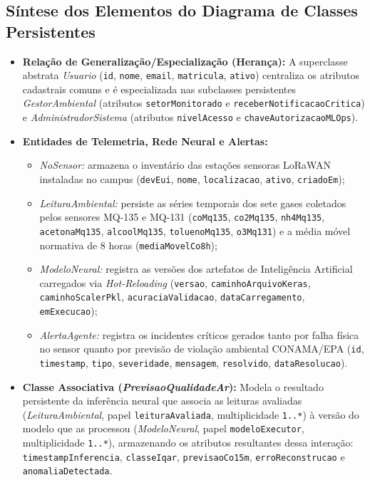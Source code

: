 \documentclass[11pt, a4paper]{article}
\begin{document}
\vspace{-0.25cm}
\subsection*{Síntese dos Elementos do Diagrama de Classes Persistentes}
\begin{small}
\begin{itemize}[nosep, leftmargin=0.6cm]
    \item \textbf{Relação de Generalização/Especialização (Herança):} A superclasse abstrata \emph{Usuario} (\texttt{id}, \texttt{nome}, \texttt{email}, \texttt{matricula}, \texttt{ativo}) centraliza os atributos cadastrais comuns e é especializada nas subclasses persistentes \emph{GestorAmbiental} (atributos \texttt{setorMonitorado} e \texttt{receberNotificacaoCritica}) e \emph{AdministradorSistema} (atributos \texttt{nivelAcesso} e \texttt{chaveAutorizacaoMLOps}).
    \item \textbf{Entidades de Telemetria, Rede Neural e Alertas:}
    \begin{itemize}[nosep, leftmargin=0.5cm]
        \item \emph{NoSensor:} armazena o inventário das estações sensoras LoRaWAN instaladas no campus (\texttt{devEui}, \texttt{nome}, \texttt{localizacao}, \texttt{ativo}, \texttt{criadoEm});
        \item \emph{LeituraAmbiental:} persiste as séries temporais dos sete gases coletados pelos sensores MQ-135 e MQ-131 (\texttt{coMq135}, \texttt{co2Mq135}, \texttt{nh4Mq135}, \texttt{acetonaMq135}, \texttt{alcoolMq135}, \texttt{toluenoMq135}, \texttt{o3Mq131}) e a média móvel normativa de 8 horas (\texttt{mediaMovelCo8h});
        \item \emph{ModeloNeural:} registra as versões dos artefatos de Inteligência Artificial carregados via \emph{Hot-Reloading} (\texttt{versao}, \texttt{caminhoArquivoKeras}, \texttt{caminhoScalerPkl}, \texttt{acuraciaValidacao}, \texttt{dataCarregamento}, \texttt{emExecucao});
        \item \emph{AlertaAgente:} registra os incidentes críticos gerados tanto por falha física no sensor quanto por previsão de violação ambiental CONAMA/EPA (\texttt{id}, \texttt{timestamp}, \texttt{tipo}, \texttt{severidade}, \texttt{mensagem}, \texttt{resolvido}, \texttt{dataResolucao}).
    \end{itemize}
    \item \textbf{Classe Associativa (\emph{PrevisaoQualidadeAr}):} Modela o resultado persistente da inferência neural que associa as leituras avaliadas (\emph{LeituraAmbiental}, papel \texttt{leituraAvaliada}, multiplicidade \texttt{1..*}) à versão do modelo que as processou (\emph{ModeloNeural}, papel \texttt{modeloExecutor}, multiplicidade \texttt{1..*}), armazenando os atributos resultantes dessa interação: \texttt{timestampInferencia}, \texttt{classeIqar}, \texttt{previsaoCo15m}, \texttt{erroReconstrucao} e \texttt{anomaliaDetectada}.

\end{itemize}
\end{small}
\end{document}
